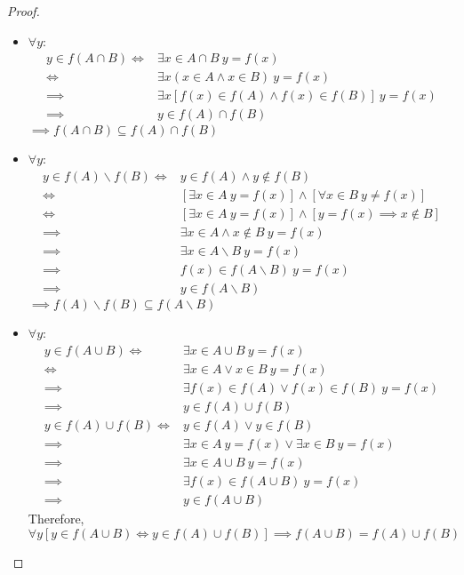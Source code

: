 \documentclass[a4paper]{book}
\newtheorem*{proof}{\textit{Proof.}}
\theoremstyle{break}
\begin{document}
			\begin{proof}~
				\begin{itemize}
					\item $\forall y$:
						\begin{align*}
							y\in f(A\cap B)\iff & \exists x\in A\cap B~y=f(x)\\
							\iff &\exists x(x\in A\land x\in B)~y=f(x)\\
							\implies & \exists x[f(x)\in f(A)\land f(x)\in f(B)]~y=f(x)\\
							\implies & y\in f(A)\cap f(B)
						\end{align*}
						$\implies f(A\cap B)\subseteq f(A)\cap f(B)$
					\item $\forall y$:
					\begin{align*}
						y\in f(A)\backslash f(B) \iff & y\in f(A)\land y\notin f(B)\\
						\iff & [\exists x\in A~y=f(x)]\land[\forall x\in B~y\neq f(x)]\\
						\iff & [\exists x\in A~y=f(x)]\land[y=f(x)\implies x\notin B]\\
						\implies & \exists x\in A\land x\notin B~y=f(x)\\
						\implies & \exists x\in A\backslash B~y=f(x)\\
						\implies & f(x)\in f(A\backslash B)~y=f(x)\\
						\implies & y\in f(A\backslash B)
					\end{align*}
					$\implies f(A)\backslash f(B)\subseteq f(A\backslash B)$
					\item $\forall y$:
					\begin{align*}
						y\in f(A\cup B)\iff & \exists x\in A\cup B~y=f(x)\\
						\iff & \exists x\in A\lor x\in B~y=f(x)\\
						\implies & \exists f(x)\in f(A)\lor f(x)\in f(B)~y=f(x)\\
						\implies & y\in f(A)\cup f(B)\\
						y\in f(A)\cup f(B)\iff & y\in f(A)\lor y\in f(B)\\
						\implies & \exists x\in A~y=f(x) \lor \exists x\in B~y=f(x)\\
						\implies & \exists x\in A\cup B~y=f(x)\\
						\implies & \exists f(x)\in f(A\cup B)~y=f(x)\\
						\implies & y\in f(A\cup B)
					\end{align*}
					Therefore, $\forall y[y\in f(A\cup B)\iff y\in f(A)\cup f(B)]\implies f(A\cup B)=f(A)\cup f(B)$
				\end{itemize}
			\end{proof}
\end{document}
